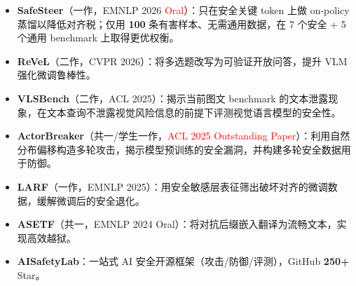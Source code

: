 \documentclass{resume}
\begin{document}
\begin{itemize}
  \item \textbf{SafeSteer}（一作，EMNLP 2026 \textcolor{red}{Oral}）：只在安全关键 token 上做 on-policy 蒸馏以降低对齐税；仅用 \textbf{100} 条有害样本、无需通用数据，在 7 个安全 + 5 个通用 benchmark 上取得更优权衡。
  \item \textbf{ReVeL}（二作，CVPR 2026）：将多选题改写为可验证开放问答，提升 VLM 强化微调鲁棒性。
\end{itemize}

\begin{itemize}
  \item \textbf{VLSBench}（二作，ACL 2025）：揭示当前图文 benchmark 的文本泄露现象，在文本查询不泄露视觉风险信息的前提下评测视觉语言模型的安全性。
  \item \textbf{ActorBreaker}（共一/学生一作，\textcolor{red}{ACL 2025 Outstanding Paper}）：利用自然分布偏移构造多轮攻击，揭示模型预训练的安全漏洞，并构建多轮安全数据用于防御。
  \item \textbf{LARF}（一作，EMNLP 2025）：用安全敏感层表征筛出破坏对齐的微调数据，缓解微调后的安全退化。
  
\end{itemize}

\begin{itemize}
  \item \textbf{ASETF}（共一，EMNLP 2024 Oral）：将对抗后缀嵌入翻译为流畅文本，实现高效越狱。
  \item \textbf{AISafetyLab}：一站式 AI 安全开源框架（攻击/防御/评测），GitHub \textbf{250+} Star。
\end{itemize}
\end{document}
